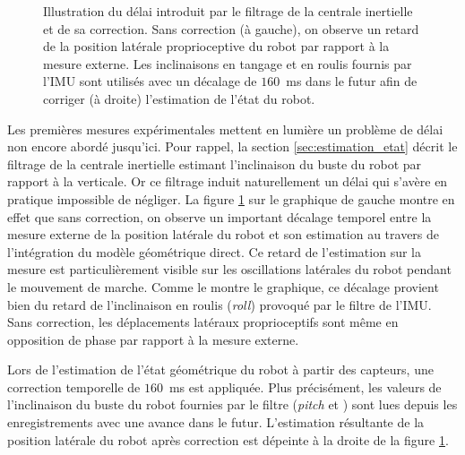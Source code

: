 \begin{figure}[htb]
\begin{subfigure}{0.4\paperwidth}
    \end{subfigure}
    \caption{\label{fig:odometry_lwpr_imu_delay} 
        Illustration du délai introduit par le filtrage de la centrale inertielle et de sa correction. 
        Sans correction (à gauche), on observe un retard de la position latérale proprioceptive 
        du robot par rapport à la mesure externe.
        Les inclinaisons en tangage et en roulis fournis par l'IMU sont utilisés avec un décalage 
        de $160$~ms dans le futur afin de corriger (à droite) l'estimation de l'état du robot.
    }
\end{figure}

Les premières mesures expérimentales mettent en lumière un problème 
de délai non encore abordé jusqu'ici.
Pour rappel, la section \ref{sec:estimation_etat} décrit le filtrage de la centrale
inertielle estimant l'inclinaison du buste du robot par rapport à la verticale.
Or ce filtrage induit naturellement un délai qui s'avère en pratique impossible de négliger.
La figure \ref{fig:odometry_lwpr_imu_delay} sur le graphique de gauche montre en effet
que sans correction, on observe un important décalage temporel entre la mesure 
externe de la position latérale du robot et son estimation au travers de l'intégration 
du modèle géométrique direct. 
Ce retard de l'estimation sur la mesure est particulièrement visible 
sur les oscillations latérales du robot pendant le mouvement de marche.
Comme le montre le graphique, ce décalage provient bien du retard de l'inclinaison
en roulis (\textit{roll}) provoqué par le filtre de l'IMU.
Sans correction, les déplacements latéraux proprioceptifs sont
même en opposition de phase par rapport à la mesure externe.

Lors de l'estimation de l'état géométrique du robot à partir des capteurs, 
une correction temporelle de $160$~ms est appliquée.
Plus précisément, les valeurs de l'inclinaison du buste du robot fournies par 
le filtre (\textit{pitch} et ) sont lues depuis les enregistrements 
avec une avance dans le futur.
L'estimation résultante de la position latérale du robot après correction 
est dépeinte à la droite de la figure \ref{fig:odometry_lwpr_imu_delay}.\\

